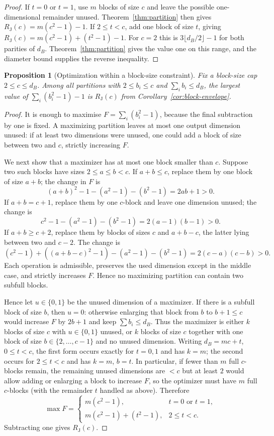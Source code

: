 \documentclass[11pt,a4paper]{article}
\theoremstyle{definition}
\theoremstyle{plain}
\newtheorem{proposition}[theorem]{Proposition}
\theoremstyle{remark}
\begin{document}
\begin{proof}
If $t=0$ or $t=1$, use $m$ blocks of size $c$ and leave the possible
one-dimensional remainder unused. Theorem~\ref{thm:partition} then gives
$R_{\mathrm J}(c)=m(c^2-1)-1$. If $2\leq t<c$, add one block of size $t$, giving
$R_{\mathrm J}(c)=m(c^2-1)+(t^2-1)-1$. For $c=2$ this is $3\lfloor d_B/2\rfloor-1$ for both parities of $d_B$. Theorem~\ref{thm:partition} gives the value one
on this range, and the diameter bound supplies the reverse inequality.
\end{proof}

\begin{proposition}[Optimization within a block-size constraint]
\label{prop:partition-optimization}
Fix a block-size cap $2\leq c\leq d_B$. Among all partitions with
$2\leq b_i\leq c$ and $\sum_i b_i\leq d_B$, the largest value of
$\sum_i(b_i^2-1)-1$ is $R_{\mathrm J}(c)$ from
Corollary~\ref{cor:block-envelope}.
\end{proposition}

\begin{proof}
It is enough to maximise
$F=\sum_i(b_i^2-1)$, because the final subtraction by one is fixed.
A maximizing partition leaves at most one output dimension unused: if at
least two dimensions were unused, one could add a block of size between two
and $c$, strictly increasing $F$.

We next show that a maximizer has at most one block smaller than $c$.
Suppose two such blocks have sizes $2\leq a\leq b<c$. If $a+b\leq c$,
replace them by one block of size $a+b$; the change in $F$ is
\[
(a+b)^2-1-(a^2-1)-(b^2-1)=2ab+1>0.
\]
If $a+b=c+1$, replace them by one $c$-block and leave one dimension unused;
the change is
\[
c^2-1-(a^2-1)-(b^2-1)=2(a-1)(b-1)>0.
\]
If $a+b\geq c+2$, replace them by blocks of sizes $c$ and $a+b-c$, the
latter lying between two and $c-2$. The change is
\[
(c^2-1)+((a+b-c)^2-1)-(a^2-1)-(b^2-1)
=2(c-a)(c-b)>0.
\]
Each operation is admissible, preserves the used dimension except in the
middle case, and strictly increases $F$. Hence no maximizing partition can
contain two subfull blocks.

Hence let $u\in\{0,1\}$ be the unused dimension of a maximizer. If there is a
subfull block of size $b$, then $u=0$: otherwise enlarging that block from
$b$ to $b+1\leq c$ would increase $F$ by $2b+1$ and keep $\sum b_i\le d_B$. Thus the maximizer is
either $k$ blocks of size $c$ with $u\in\{0,1\}$ unused, or $k$ blocks of
size $c$ together with one block of size $b\in\{2,\ldots,c-1\}$ and no
unused dimension. Writing $d_B=mc+t$, $0\leq t<c$, the first form occurs
exactly for $t=0,1$ and has $k=m$; the second occurs for $2\leq t<c$ and has
$k=m$, $b=t$. In particular, if fewer than $m$ full $c$-blocks remain, the remaining unused dimensions are $<c$ but at least $2$ would allow adding or enlarging a block to increase $F$, so the optimizer must have $m$ full $c$-blocks (with the remainder $t$ handled as above). Therefore
\[
\max F=
\begin{cases}
m(c^2-1),&t=0\text{ or }t=1,\\
m(c^2-1)+(t^2-1),&2\leq t<c.
\end{cases}
\]
Subtracting one gives $R_{\mathrm J}(c)$.
\end{proof}
\end{document}
